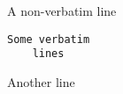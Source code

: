 \documentclass{article}
\begin{document}
\thispagestyle{empty}

\noindent A non-verbatim line
\begin{Verbatim}[xleftmargin=.5in]
Some verbatim
	lines
\end{Verbatim}
\noindent Another line
\end{document}
